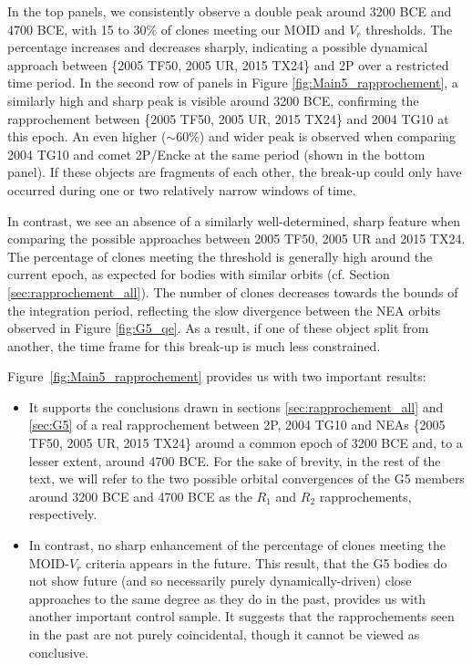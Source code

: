 \documentclass[letters,a4paper,fleqn,usenatbib]{mnras}
\begin{document}
 In the top panels, we consistently observe a double peak around 3200 BCE and 4700 BCE, with 15 to 30\% of clones meeting our MOID and $V_r$ thresholds. The percentage increases and decreases sharply, indicating a possible dynamical approach between \{2005 TF50, 2005 UR, 2015 TX24\} and 2P over a restricted time period. In the second row of panels in Figure \ref{fig:Main5_rapprochement}, a similarly high and sharp peak is visible around 3200 BCE, confirming the rapprochement between \{2005 TF50, 2005 UR, 2015 TX24\} and 2004 TG10 at this epoch. An even higher ($\sim$60\%) and wider peak is observed when comparing 2004 TG10 and comet 2P/Encke at the same period (shown in the bottom panel). If these objects are fragments of each other, the break-up could only have occurred during one or two relatively narrow windows of time.

 In contrast, we see an absence of a similarly well-determined, sharp feature when comparing the possible approaches between 2005 TF50, 2005 UR and 2015 TX24. The percentage of clones meeting the threshold is generally high around the current epoch, as expected for bodies with similar orbits (cf. Section \ref{sec:rapprochement_all}). The number of clones decreases towards the bounds of the integration period, reflecting the slow divergence between the NEA orbits observed in Figure \ref{fig:G5_qe}. As a result, if one of these object split from another, the time frame for this break-up is much less constrained.
 
 Figure~\ref{fig:Main5_rapprochement} provides us with two important results:
 \begin{itemize}
 \item It supports the conclusions drawn in sections \ref{sec:rapprochement_all} and \ref{sec:G5} of a real rapprochement between 2P, 2004 TG10 and NEAs \{2005 TF50, 2005 UR, 2015 TX24\} around a common epoch of 3200 BCE and, to a lesser extent, around 4700 BCE. For the sake of brevity, in the rest of the text, we will refer to the two possible orbital convergences of the G5 members around 3200 BCE and 4700 BCE as the $R_1$ and $R_2$ rapprochements, respectively. 
  \item  In contrast, no sharp enhancement of the percentage of clones meeting the MOID-$V_r$ criteria appears in the future. This result, that the G5 bodies do not show future (and so necessarily purely dynamically-driven) close approaches to the same degree as they do in the past, provides us with another important control sample.
  It suggests that the rapprochements seen in the past are not purely coincidental, though it cannot be viewed as conclusive.
 \end{itemize}
 
\end{document}
